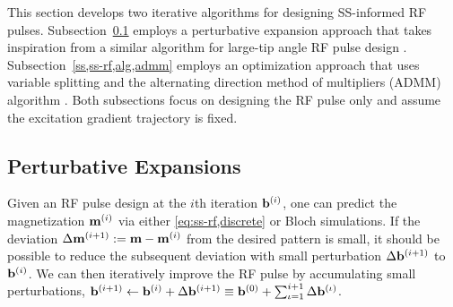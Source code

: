 This section develops two iterative algorithms
for designing SS-informed RF pulses.
Subsection~\ref{ss,ss-rf,alg,pert}
employs a perturbative expansion approach
that takes inspiration 
from a similar algorithm 
for large-tip angle RF pulse design \cite{grissom:09:flt}.
Subsection~\ref{ss,ss-rf,alg,admm}
employs an optimization approach
that uses variable splitting 
and the alternating direction 
method of multipliers (ADMM) algorithm \cite{gabay:76:ada}.
Both subsections focus 
on designing the RF pulse only
and assume the excitation gradient trajectory is fixed. 

\subsection{Perturbative Expansions}
\label{ss,ss-rf,alg,pert}

Given an RF pulse design 
at the $i$th iteration $\iter{\bmb}{i}$, 
one can predict the magnetization $\iter{\bmm}{i}$ 
via either \eqref{eq:ss-rf,discrete} or Bloch simulations. 
If the deviation $\Delta \iter{\bmm}{i+1} := \mathbf{m} - \iter{\bmm}{i}$ 
from the desired pattern is small, 
it should be possible 
to reduce the subsequent deviation 
with small perturbation $\Delta \iter{\bmb}{i+1}$ to $\iter{\bmb}{i}$. 
We can then iteratively improve the RF pulse 
by accumulating small perturbations, \ie  
$\iter{\bmb}{i+1} \gets \iter{\bmb}{i} + \Delta \iter{\bmb}{i+1} 
	\equiv \iter{\bmb}{0} + \sum_{\iota=1}^{i+1} \Delta \iter{\bmb}{\iota}$.

